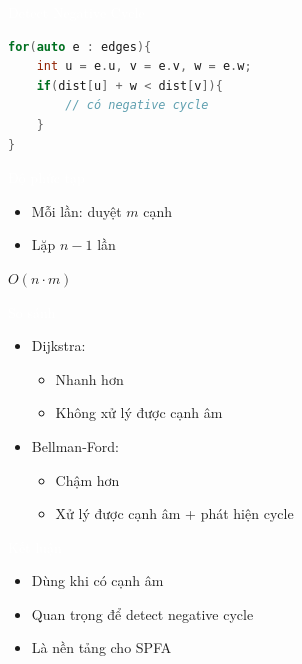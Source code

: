 \documentclass{beamer}
\newcommand{\hlgreen}[1]{\textcolor{mygreen}{#1}}
\newcommand{\hlred}[1]{\textcolor{myred}{#1}}
\newcommand{\hlwhite}[1]{\textcolor{white}{#1}}
\begin{document}
\begin{frame}[fragile]{\hlwhite{Detect Negative Cycle}}
\begin{lstlisting}[language=C++]
for(auto e : edges){
    int u = e.u, v = e.v, w = e.w;
    if(dist[u] + w < dist[v]){
        // có negative cycle
    }
}
\end{lstlisting}
\end{frame}


\begin{frame}{\hlwhite{Độ phức tạp}}
\begin{itemize}
\item Mỗi lần: duyệt $m$ cạnh
\item Lặp $n-1$ lần
\end{itemize}

\begin{tcolorbox}
\centering
\hlred{$O(n \cdot m)$}
\end{tcolorbox}
\end{frame}


\begin{frame}{\hlwhite{So sánh}}
\begin{itemize}
\item Dijkstra:
\begin{itemize}
\item Nhanh hơn
\item Không xử lý được cạnh âm
\end{itemize}

\item Bellman-Ford:
\begin{itemize}
\item Chậm hơn
\item \hlgreen{Xử lý được cạnh âm + phát hiện cycle}
\end{itemize}
\end{itemize}
\end{frame}


\begin{frame}{\hlwhite{Kết luận}}
\begin{itemize}
\item Dùng khi có cạnh âm
\item Quan trọng để detect negative cycle
\item Là nền tảng cho SPFA
\end{itemize}
\end{frame}
\end{document}
